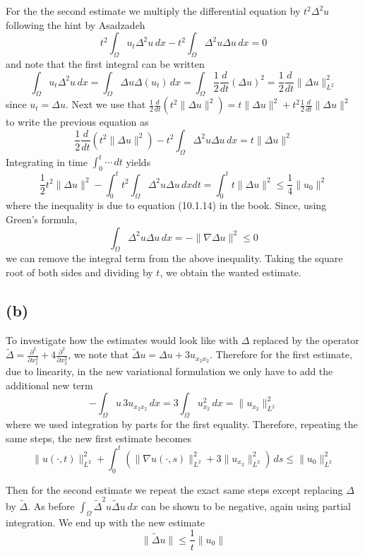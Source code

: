 \documentclass{article}
\begin{document}
For the the second estimate we multiply the differential equation
by $t^2 \Delta^2 u$ following the hint by Asadzadeh
$$ t^2 \int_\Omega u_t \Delta^2 u \, dx - t^2 \int_\Omega \Delta^2 u \Delta u \, dx = 0 $$
and note that the first integral can be written
\begin{equation*}
  \int_\Omega u_t \Delta^2 u \, dx = \int_\Omega \Delta u \Delta (u_t) \, dx
  = \int_\Omega \frac12 \frac d{dt} (\Delta u)^2 = \frac12 \frac d{dt} \lVert \Delta u \rVert_{L^2}^2
\end{equation*}
since $u_t = \Delta u$.
Next we use that
$\frac12 \frac d{dt} (t^2 \lVert \Delta u \rVert^2) = t \lVert \Delta u \rVert^2 + t^2 \frac12 \frac d{dt} \lVert \Delta u \rVert^2$
to write the previous equation as
$$ \frac12 \frac d{dt} (t^2 \lVert \Delta u \rVert^2) - t^2 \int_\Omega \Delta^2 u \Delta u \, dx = t \lVert \Delta u \rVert^2 $$
Integrating in time $\int_0^t \cdots \, dt$ yields
$$ \frac12 t^2 \lVert \Delta u \rVert^2 - \int_0^t t^2 \int_\Omega \Delta^2 u \Delta u \, dx dt = \int_0^t t \lVert \Delta u \rVert^2 \le \frac14 \lVert u_0 \rVert^2 $$
where the inequality is due to equation (10.1.14) in the book.
Since, using Green's formula,
$$ \int_\Omega \Delta^2 u \Delta u \, dx = -\lVert \nabla \Delta u \rVert^2 \le 0 $$
we can remove the integral term from the above inequality.
Taking the square root of both sides and dividing by $t$,
we obtain the wanted estimate.

\subsection{(b)}

To investigate how the estimates would look like
with $\Delta$ replaced by the operator
$\widetilde\Delta = \frac{\partial^2}{\partial x_1^2} + 4 \frac{\partial^2}{\partial x_2^2}$,
we note that $\widetilde\Delta u = \Delta u + 3 u_{x_2 x_2}$.
Therefore for the first estimate,
due to linearity, in the new variational formulation
we only have to add the additional new term
$$ -\int_\Omega u \, 3 u_{x_2 x_2} \, dx = 3 \int_\Omega u_{x_2}^2 \, dx = \lVert u_{x_2} \rVert_{L^2}^2 $$
where we used integration by parts for the first equality.
Therefore, repeating the same steps, the new first estimate becomes
$$ \lVert u(\cdot, t) \rVert_{L^2}^2 + \int_0^t \left( \lVert \nabla u(\cdot, s) \rVert_{L^2}^2 + 3 \lVert u_{x_2} \rVert_{L^2}^2 \right) \, ds \le \lVert u_0 \rVert_{L^2}^2 $$

Then for the second estimate we repeat the exact same steps
except replacing $\Delta$ by $\widetilde\Delta$.
As before $\int_\Omega \widetilde\Delta^2 u \widetilde\Delta u \, dx$
can be shown to be negative, again using partial integration.
We end up with the new estimate
$$ \lVert \widetilde\Delta u \rVert \le \frac1t \lVert u_0 \rVert $$
\end{document}
